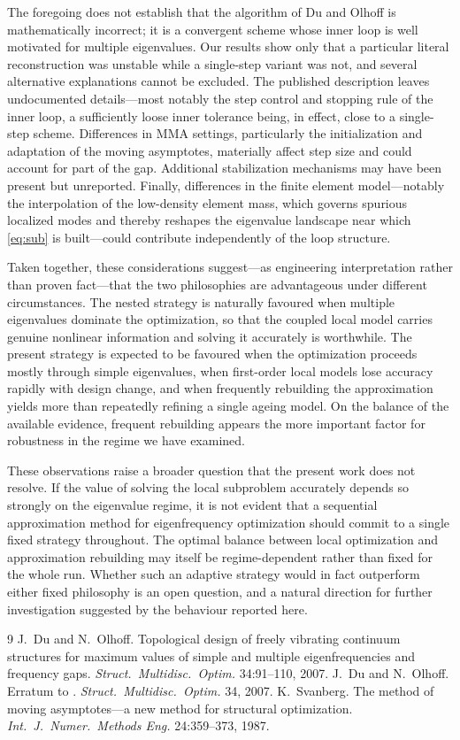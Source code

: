 \documentclass[11pt]{article}
\begin{document}
The foregoing does not establish that the algorithm of Du and Olhoff is
mathematically incorrect; it is a convergent scheme whose inner loop is
well motivated for multiple eigenvalues. Our results show only that a
particular literal reconstruction was unstable while a single-step variant
was not, and several alternative explanations cannot be excluded. The
published description leaves undocumented details---most notably the step
control and stopping rule of the inner loop, a sufficiently loose inner
tolerance being, in effect, close to a single-step scheme. Differences in
MMA settings, particularly the initialization and adaptation of the moving
asymptotes, materially affect step size and could account for part of the
gap. Additional stabilization mechanisms may have been present but
unreported. Finally, differences in the finite element model---notably the
interpolation of the low-density element mass, which governs spurious
localized modes and thereby reshapes the eigenvalue landscape near which
\eqref{eq:sub} is built---could contribute independently of the loop
structure.

Taken together, these considerations suggest---as engineering
interpretation rather than proven fact---that the two philosophies are
advantageous under different circumstances. The nested strategy is naturally
favoured when multiple eigenvalues dominate the optimization, so that the
coupled local model carries genuine nonlinear information and solving it
accurately is worthwhile. The present strategy is expected to be favoured
when the optimization proceeds mostly through simple eigenvalues, when
first-order local models lose accuracy rapidly with design change, and when
frequently rebuilding the approximation yields more than repeatedly refining
a single ageing model. On the balance of the available evidence, frequent
rebuilding appears the more important factor for robustness in the regime we
have examined.

These observations raise a broader question that the present work does not
resolve. If the value of solving the local subproblem accurately depends so
strongly on the eigenvalue regime, it is not evident that a sequential
approximation method for eigenfrequency optimization should commit to a
single fixed strategy throughout. The optimal balance between local
optimization and approximation rebuilding may itself be regime-dependent
rather than fixed for the whole run. Whether such an adaptive strategy would
in fact outperform either fixed philosophy is an open question, and a natural
direction for further investigation suggested by the behaviour reported here.

\begin{thebibliography}{9}
 J.~Du and N.~Olhoff.
Topological design of freely vibrating continuum structures for maximum
values of simple and multiple eigenfrequencies and frequency gaps.
\emph{Struct.\ Multidisc.\ Optim.} 34:91--110, 2007.
 J.~Du and N.~Olhoff. Erratum to
\cite{DuOlhoff2007}. \emph{Struct.\ Multidisc.\ Optim.} 34, 2007.
 K.~Svanberg. The method of moving asymptotes---a
new method for structural optimization.
\emph{Int.\ J.\ Numer.\ Methods Eng.} 24:359--373, 1987.
\end{thebibliography}
\end{document}
